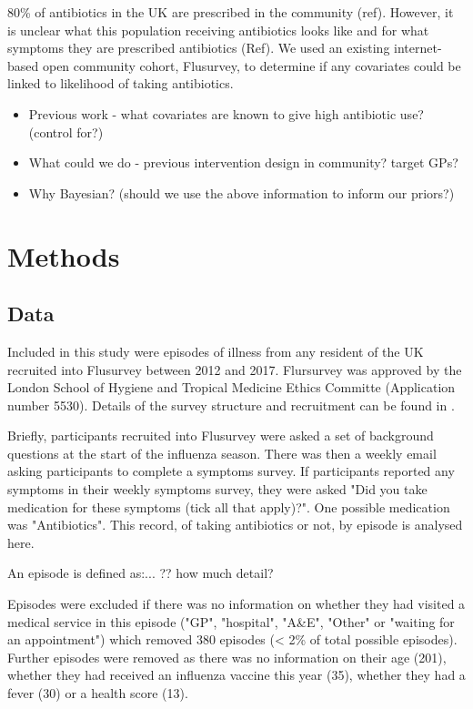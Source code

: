 \documentclass{article}
\begin{document}
80\% of antibiotics in the UK are prescribed in the community (ref). However, it is unclear what this population receiving antibiotics looks like and for what symptoms they are prescribed antibiotics (Ref). We used an existing internet-based open community cohort, Flusurvey, to determine if any covariates could be linked to likelihood of taking antibiotics. 

\begin{itemize}
	\item Previous work - what covariates are known to give high antibiotic use? (control for?)
	\item What could we do - previous intervention design in community? target GPs?
\item Why Bayesian? (should we use the above information to inform our priors?)
\end{itemize}

\clearpage

\section{Methods}

\subsection{Data}

Included in this study were episodes of illness from any resident of the UK recruited into Flusurvey between 2012 and 2017. Flursurvey was approved by the London School of Hygiene and Tropical Medicine Ethics Committe (Application number 5530). Details of the survey structure and recruitment can be found in \cite{Adler2014}. 

Briefly, participants recruited into Flusurvey were asked a set of background questions at the start of the influenza season. There was then a weekly email asking participants to complete a symptoms survey. If participants reported any symptoms in their weekly symptoms survey, they were asked "Did you take medication for these symptoms (tick all that apply)?". One possible medication was "Antibiotics". This record, of taking antibiotics or not, by episode is analysed here. 

An episode is defined as:... ?? how much detail?

Episodes were excluded if there was no information on whether they had visited a medical service in this episode ("GP", "hospital", "A\&E", "Other" or "waiting for an appointment") which removed 380 episodes (< 2\% of total possible episodes). Further episodes were removed as there was no information on their age (201), whether they had received an influenza vaccine this year (35), whether they had a fever (30) or a health score (13).  
\end{document}
